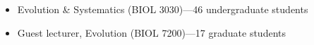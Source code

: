 \begin{itemize}
    \item Evolution \& Systematics (BIOL 3030)---46 undergraduate students
    \item Guest lecturer, Evolution (BIOL 7200)---17 graduate students
\end{itemize}
